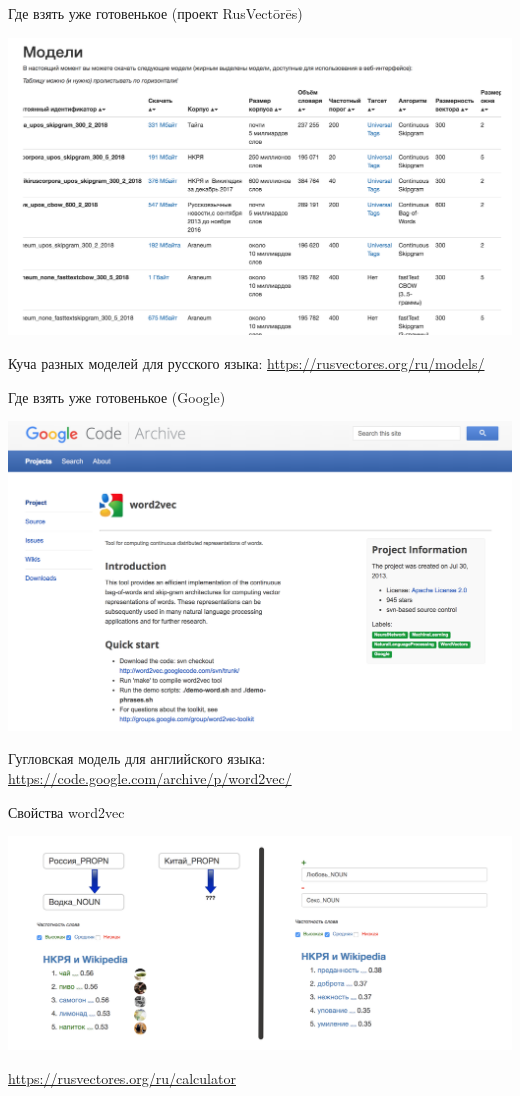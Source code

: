 \documentclass[notes,12pt, aspectratio=169]{beamer}
\begin{document}
\begin{frame}{Где взять уже готовенькое (проект RusVectōrēs)}
\begin{center}
\includegraphics[width=.7\linewidth]{rusvec_models.png}
\end{center}

\vfill

\footnotesize Куча разных моделей для русского языка:  {\color{blue} \url{https://rusvectores.org/ru/models/}}
\end{frame} 


\begin{frame}{Где взять уже готовенькое (Google)}
\begin{center}
	\includegraphics[width=.65\linewidth]{google_wv.png}
\end{center}

\vfill

\footnotesize Гугловская модель для английского языка:  {\color{blue} \url{https://code.google.com/archive/p/word2vec/}}
\end{frame} 




\begin{frame}{Свойства word2vec}
\begin{center}
\includegraphics[width=.85\linewidth]{rusvec_calc2.png}
\end{center}
\vfill
\footnotesize  {\color{blue} \url{https://rusvectores.org/ru/calculator}}
\end{frame} 
\end{document}
